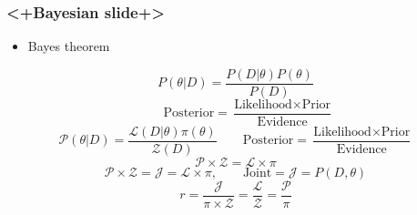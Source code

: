 \documentclass[aspectratio=169,handout]{beamer}
\begin{document}
\begin{frame}
    \frametitle{<+Bayesian slide+>}
    \begin{itemize}
        \item Bayes theorem
    \end{itemize}
        \[
                P(\theta|D) = \frac{P(D|\theta)P(\theta)}{P(D)}
        \]
        \[
            \qquad
            \text{Posterior} = \frac{\text{Likelihood}\times\text{Prior}}{\text{Evidence}}
        \]
        \[
                \mathcal{P}(\theta|D) = \frac{\mathcal{L}(D|\theta)\pi(\theta)}{\mathcal{Z}(D)}
            \qquad
            \text{Posterior} = \frac{\text{Likelihood}\times\text{Prior}}{\text{Evidence}}
        \]
        \[
                \mathcal{P}\times\mathcal{Z} = \mathcal{L}\times\pi
            \]
            \[
                \mathcal{P}\times\mathcal{Z} = \mathcal{J} = \mathcal{L}\times\pi, \qquad \text{Joint} = \mathcal{J} = P(D,\theta)
            \]
            \[r = \frac{\mathcal{J}}{\pi\times\mathcal{Z}} = \frac{\mathcal{L}}{\mathcal{Z}} = \frac{\mathcal{P}}{\pi}\]
\end{frame}
\end{document}
